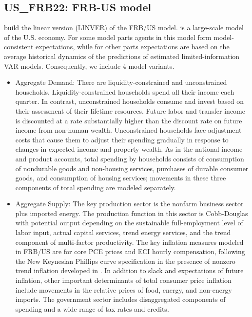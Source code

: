 \documentclass[11pt,a4paper]{article}
\begin{document}
	\subsection{US\_FRB22: FRB-US model}
\label{USFRB22}
\cite{brayton2022linver} build the linear version (LINVER) of the FRB/US model. \cite{brayton2014frb} is a large-scale model of the U.S. economy. For some model parts agents in this model form model-consistent expectations, while for other parts expectations are based on the average historical dynamics of the predictions of estimated limited-information VAR models. Consequently, we include 4 model variants.
\begin{itemize}
\item Aggregate Demand: There are liquidity-constrained and unconstrained households. Liquidity-constrained households spend all their income each quarter. In contrast, unconstrained households consume and invest based on their assessment of their lifetime resources. Future labor and transfer income is discounted at a rate substantially higher than the discount rate on future income from non-human wealth. Unconstrained households face adjustment costs that cause them to adjust their spending gradually in response to changes in expected income and property wealth. As in the national income and product accounts, total spending by households consists of consumption of nondurable goods and non-housing services, purchases of durable consumer goods, and consumption of housing services; movements in these three components of total spending are modeled separately. 

\item Aggregate Supply: The key production sector is the nonfarm business sector plus imported energy. The production function in this sector is Cobb-Douglas with potential output depending on the sustainable full-employment level of labor input, actual capital services, trend energy services, and the trend component of multi-factor productivity. The key inflation measures modeled in FRB/US are for core PCE prices and ECI hourly compensation, following the New Keynesian Phillips curve specification in the presence of nonzero trend inflation developed in \cite{cogley2008trend}. In addition to slack and expectations of future inflation, other important determinants of total consumer price inflation include movements in the relative prices of food, energy, and non-energy imports. The government sector includes disaggregated components of spending and a wide range of tax rates and credits.


\end{itemize}
\end{document}
